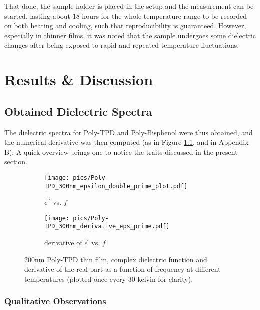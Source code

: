 That done, the sample holder is placed in the setup and the measurement can be started, lasting about 18 hours for the whole temperature range to be recorded on both heating and cooling, such that reproducibility is guaranteed. However, especially in thinner films, it was noted that the sample undergoes some dielectric changes after being exposed to rapid and repeated temperature fluctuations.

\chapter{Results \& Discussion}

\section{Obtained Dielectric Spectra}
The dielectric spectra for Poly-TPD and Poly-Bisphenol were thus obtained, and the numerical derivative was then computed (as in Figure \ref{300tpd}, and in Appendix B). A quick overview brings one to notice the traits discussed in the present section.
%

\begin{figure}[!htb]
\centering
\begin{subfigure}[t]{.5\textwidth}
  \centering
  \texttt{[image: pics/Poly-TPD\_300nm\_epsilon\_double\_prime\_plot.pdf]}
  \caption{$\epsilon^{\prime\prime}$ vs. $f$}
\end{subfigure}%
\begin{subfigure}[t]{.5\textwidth}
  \centering
  \texttt{[image: pics/Poly-TPD\_300nm\_derivative\_eps\_prime.pdf]}
  \caption{derivative of $\epsilon^\prime$ vs. $f$}
\end{subfigure}
\caption{200nm Poly-TPD thin film, complex dielectric function and derivative of the real part as a function of frequency at different temperatures (plotted once every 30 kelvin for clarity).}
  \label{300tpd}
\end{figure}
\subsection{Qualitative Observations}

